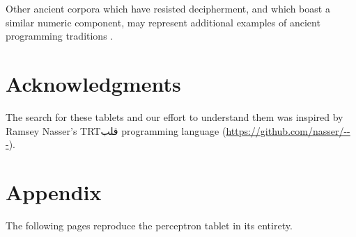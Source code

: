 \documentclass[11pt]{article}
\newcommand{\textarabic}[1]     %
    {\bgroup\textdir TRT\arabicfont #1\egroup}
\begin{document}
Other ancient corpora which have resisted decipherment, and which boast a similar numeric component, may represent additional examples of ancient programming traditions \cite{kelley2022}.


\section*{Acknowledgments}
The search for these tablets and our effort to understand them was inspired by Ramsey Nasser's \textarabic{قلب} programming language (\url{https://github.com/nasser/---}).



\appendix

\section{Appendix}
\label{sec:appendix}

The following pages reproduce the perceptron tablet in its entirety.

\onecolumn
\tiny
\noindent

\normalsize
\end{document}
